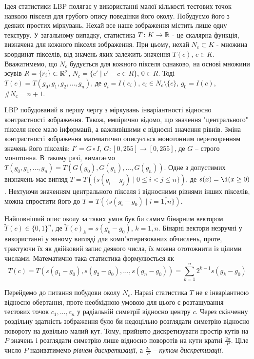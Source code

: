 Ідея статистики LBP \cite{ojala2002} полягає у використанні малої кількості тестових точок навколо пікселя для грубого опису поведінки його околу.
Побудуємо його з деяких простих міркувань.
Нехай все наше зображення містить лише одну текстуру.
У загальному випадку, статистика $T \colon K \to \mathbb R$ - це скалярна функція, визначена для кожного пікселя зображення. 
При цьому, нехай $N_c \subset K$ - множина координат пікселів, від значень яких залежить значення $T(c)$, $c \in K$. 
Вважатимемо, що $N_c$ будується для кожного пікселя однаково, на основі множини зсувів $R = \{r_i\} \subset \mathbb R^2$, $N_c = \{c' \mid c' - c \in R\}$, $0 \in R$.
Тоді $T(c) = T(g_0, g_1, g_2, \dots, g_n)$, де $g_i = I(c_i)$, $c_i \in N_c \setminus \{c\}$, $g_0 = I(c)$, $\# N_c = n+1$.

LBP побудований в першу чергу з міркувань інваріантності відносно контрастності зображення.
Також, емпірично відомо, що значення "центрального"{} пікселя несе мало інформації, а важливішими є відносні значення рівнів.  
Зміна контрастності зображення математично описується монотонним перетворенням значень його пікселів: $I' = G \circ I$, $G \colon [0,255] \to [0,255]$, де $G$ -- строго монотонна.
В такому разі, вимагаємо $T(g_0, g_1, ..., g_n) = T(G(g_0), G(g_1), ..., G(g_n))$.
Одне з допустимих визначень має вигляд $T = T(\{s(g_i - g_j) \mid 0\le i<j \le n\})$, де $s(x) = \1(x \ge 0)$.
Нехтуючи значенням центрального пікселя і відносними рівнями інших пікселів, можна спростити його до $T = T(\{s(g_i - g_0) \mid i=\overline{1,n}\})$.

Найповніший опис околу за таких умов був би самим бінарним вектором $\tilde T(c) \in \{0,1\}^n$,
де $\tilde T(c)_k = s(g_k - g_0)$, $k=\overline{1,n}$.
Бінарні вектори незручні у використанні у явному вигляді для комп'ютеризованих обчислень, проте, трактуючи їх як двійковий запис деякого числа, 
їх можна ототожнити із цілими числами. Математично така статистика формулюється як 
\begin{equation}\label{e:ojala-T}
    T(c) = T(s(g_1 - g_0), s(g_2 - g_0), ..., s(g_n - g_0)) = \sum_{k=1}^n 2^{k-1}s(g_k-g_0)
\end{equation}

Перейдемо до питання побудови околу $N_c$. 
Наразі статистика $T$ не є інваріантною відносно обертання, проте необхідною умовою для цього є розташування тестових точок $c_1,...,c_n$ у 
радіальній симетрії відносно центру $c$.
Через скінченну роздільну здатність зображення було би недоцільно розглядати симетрію відносно повороту на довільно малий кут.
Тому, прийнято дискретизувати простір кутів на $P$ значень і розглядати симетрію лише відносно поворотів на кути кратні $\frac{2\pi}{P}$.
Ціле число $P$ називатимемо \emph{рівнем дискретизації}, а $\frac{2\pi}{P}$ -- \emph{кутом дискретизації}. 

